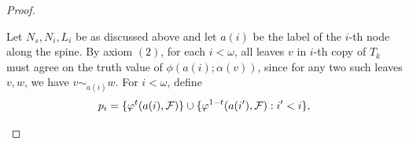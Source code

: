 \begin{proof}
\begin{outline}
{}
        \2 Let $N_s, N_i, L_i$ be as discussed above and let $a(i)$ be the label of the $i$-th node along the spine. 
        \2 By axiom $(2)$, for each $i<\omega$, all leaves $v$ in $i$-th copy of $T_k$ must agree on the truth value of $\phi(a(i); \alpha(v))$, since for any two such leaves $v,w$, we have $v\sim_{a(i)}w$.  
        \2 For $i<\omega$, define 
        $$p_i = \{\varphi^t(a(i),\mathcal{F})\} \cup \{\varphi^{1-t}(a(i'),\mathcal{F}): i' < i\},$$ 

\end{outline}
\end{proof}
